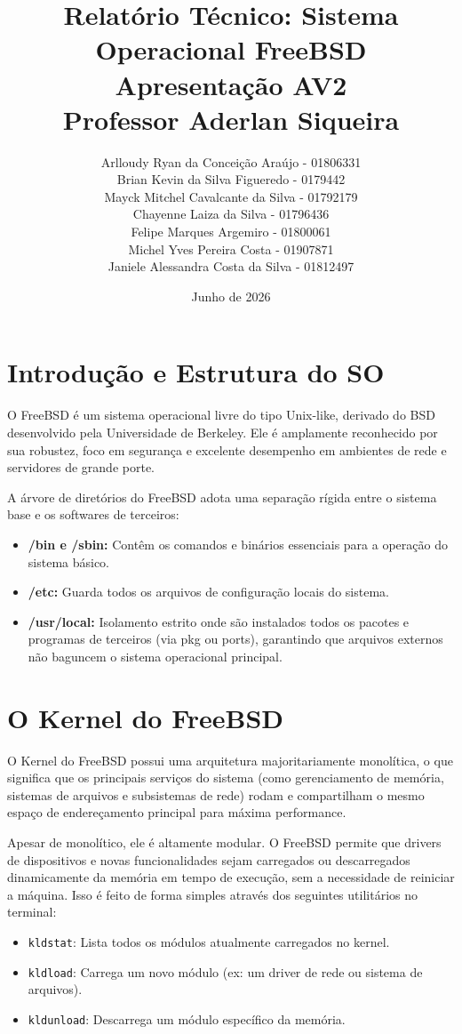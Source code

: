 \documentclass[12pt]{article}
\title{Relatório Técnico: Sistema Operacional FreeBSD \\ \large Apresentação AV2 \\ Professor Aderlan Siqueira}
\author{
Arlloudy Ryan da Conceição Araújo - 01806331 \\
Brian Kevin da Silva Figueredo - 0179442 \\
Mayck Mitchel Cavalcante da Silva - 01792179 \\ 
Chayenne Laiza da Silva - 01796436 \\
Felipe Marques Argemiro - 01800061 \\
Michel Yves Pereira Costa - 01907871\\
Janiele Alessandra Costa da Silva - 01812497\\
}
\date{Junho de 2026}
\begin{document}
\maketitle

\newpage

\section{Introdução e Estrutura do SO}
O FreeBSD é um sistema operacional livre do tipo Unix-like, derivado do BSD desenvolvido pela Universidade de Berkeley. Ele é amplamente reconhecido por sua robustez, foco em segurança e excelente desempenho em ambientes de rede e servidores de grande porte. 

A árvore de diretórios do FreeBSD adota uma separação rígida entre o sistema base e os softwares de terceiros:
\begin{itemize}
    \item \textbf{/bin e /sbin:} Contêm os comandos e binários essenciais para a operação do sistema básico.
    \item \textbf{/etc:} Guarda todos os arquivos de configuração locais do sistema.
    \item \textbf{/usr/local:} Isolamento estrito onde são instalados todos os pacotes e programas de terceiros (via pkg ou ports), garantindo que arquivos externos não baguncem o sistema operacional principal.
\end{itemize}

\section{O Kernel do FreeBSD}
O Kernel do FreeBSD possui uma arquitetura majoritariamente monolítica, o que significa que os principais serviços do sistema (como gerenciamento de memória, sistemas de arquivos e subsistemas de rede) rodam e compartilham o mesmo espaço de endereçamento principal para máxima performance. 

Apesar de monolítico, ele é altamente modular. O FreeBSD permite que drivers de dispositivos e novas funcionalidades sejam carregados ou descarregados dinamicamente da memória em tempo de execução, sem a necessidade de reiniciar a máquina. Isso é feito de forma simples através dos seguintes utilitários no terminal:
\begin{itemize}
    \item \texttt{kldstat}: Lista todos os módulos atualmente carregados no kernel.
    \item \texttt{kldload}: Carrega um novo módulo (ex: um driver de rede ou sistema de arquivos).
    \item \texttt{kldunload}: Descarrega um módulo específico da memória.
\end{itemize}
\end{document}
